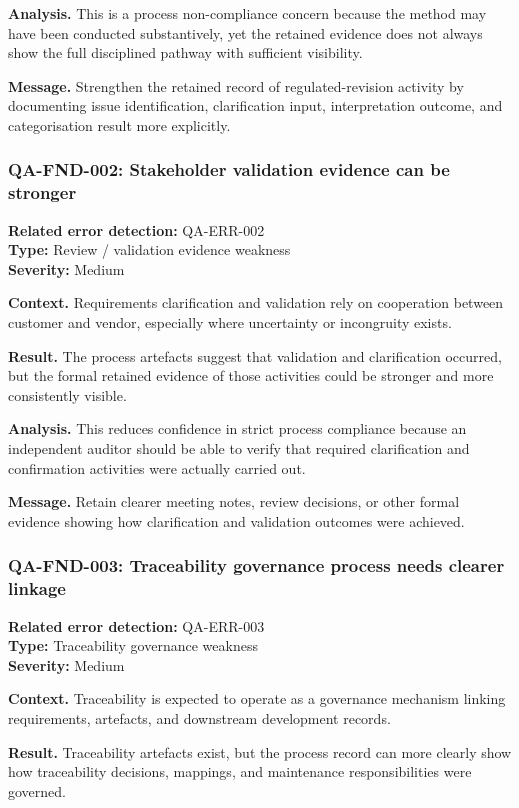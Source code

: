 \documentclass[11pt,a4paper]{article}
\begin{document}
\textbf{Analysis.} This is a process non-compliance concern because the method may have been conducted substantively, yet the retained evidence does not always show the full disciplined pathway with sufficient visibility.

\textbf{Message.} Strengthen the retained record of regulated-revision activity by documenting issue identification, clarification input, interpretation outcome, and categorisation result more explicitly.

\subsubsection*{QA-FND-002: Stakeholder validation evidence can be stronger}
\textbf{Related error detection:} QA-ERR-002 \\
\textbf{Type:} Review / validation evidence weakness \\
\textbf{Severity:} Medium

\textbf{Context.} Requirements clarification and validation rely on cooperation between customer and vendor, especially where uncertainty or incongruity exists.

\textbf{Result.} The process artefacts suggest that validation and clarification occurred, but the formal retained evidence of those activities could be stronger and more consistently visible.

\textbf{Analysis.} This reduces confidence in strict process compliance because an independent auditor should be able to verify that required clarification and confirmation activities were actually carried out.

\textbf{Message.} Retain clearer meeting notes, review decisions, or other formal evidence showing how clarification and validation outcomes were achieved.

\subsubsection*{QA-FND-003: Traceability governance process needs clearer linkage}
\textbf{Related error detection:} QA-ERR-003 \\
\textbf{Type:} Traceability governance weakness \\
\textbf{Severity:} Medium

\textbf{Context.} Traceability is expected to operate as a governance mechanism linking requirements, artefacts, and downstream development records.

\textbf{Result.} Traceability artefacts exist, but the process record can more clearly show how traceability decisions, mappings, and maintenance responsibilities were governed.
\end{document}
